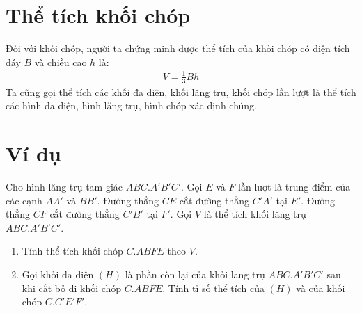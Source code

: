 \documentclass[a4paper]{book}
\begin{document}
\section{Thể tích khối chóp}
Đối với khối chóp, người ta chứng minh được thể tích của khối chóp có diện tích đáy \( B \) và chiều cao \( h \) là:
\begin{eqnarray}
    V = \frac{1}{3} Bh
\end{eqnarray}
Ta cũng gọi thể tích các khối đa diện, khối lăng trụ, khối chóp lần lượt là thể tích các hình đa diện, hình lăng trụ, hình chóp xác định chúng.

\section*{Ví dụ}
Cho hình lăng trụ tam giác $ABC.A'B'C'$. Gọi $E$ và $F$ lần lượt là trung điểm của các cạnh $AA'$ và $BB'$. Đường thẳng $CE$ cắt đường thẳng $C'A'$ tại $E'$. Đường thẳng $CF$ cắt đường thẳng $C'B'$ tại $F'$. Gọi $V$ là thể tích khối lăng trụ $ABC.A'B'C'$.

\begin{enumerate}[label=(\alph*)]
    \item Tính thể tích khối chóp $C.ABFE$ theo $V$.
    \item Gọi khối đa diện $(H)$ là phần còn lại của khối lăng trụ $ABC.A'B'C'$ sau khi cắt bỏ đi khối chóp $C.ABFE$. Tính tỉ số thể tích của $(H)$ và của khối chóp $C.C'E'F'$.
\end{enumerate}
\end{document}
